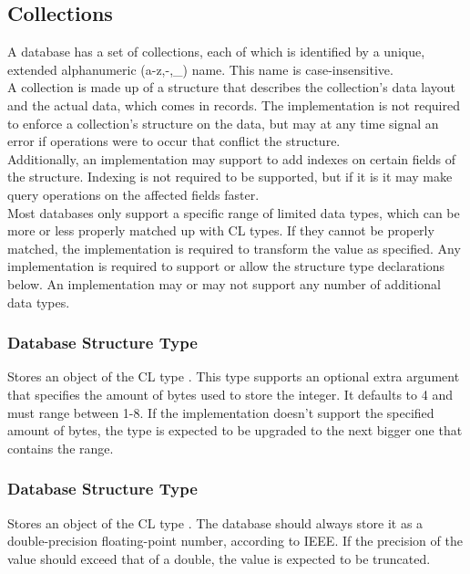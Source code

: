 \subsection{Collections}
A database has a set of collections, each of which is identified by a unique, extended alphanumeric (a-z,-,\_) name. This name is case-insensitive. \\

A collection is made up of a structure that describes the collection's data layout and the actual data, which comes in records. The implementation is not required to enforce a collection's structure on the data, but may at any time signal an error if operations were to occur that conflict the structure. \\

Additionally, an implementation may support to add indexes on certain fields of the structure. Indexing is not required to be supported, but if it is it may make query operations on the affected fields faster. \\

Most databases only support a specific range of limited data types, which can be more or less properly matched up with CL types. If they cannot be properly matched, the implementation is required to transform the value as specified. Any implementation is required to support or allow the structure type declarations below. An implementation may or may not support any number of additional data types. 

\subsubsection{Database Structure Type }
Stores an object of the CL type . This type supports an optional extra argument that specifies the amount of bytes used to store the integer. It defaults to 4 and must range between 1-8. If the implementation doesn't support the specified amount of bytes, the type is expected to be upgraded to the next bigger one that contains the range.

\subsubsection{Database Structure Type }
Stores an object of the CL type . The database should always store it as a double-precision floating-point number, according to IEEE. If the precision of the value should exceed that of a double, the value is expected to be truncated.

